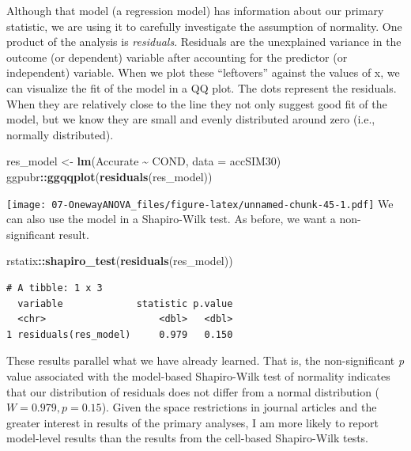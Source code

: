 \documentclass[
  11pt,
]{book}
\newenvironment{Shaded}{\begin{snugshade}}{\end{snugshade}}
\newcommand{\AttributeTok}[1]{\textcolor[rgb]{0.27,0.27,0.27}{#1}}
\newcommand{\FunctionTok}[1]{\textcolor[rgb]{0.27,0.27,0.27}{\textbf{#1}}}
\newcommand{\NormalTok}[1]{#1}
\newcommand{\OtherTok}[1]{\textcolor[rgb]{0.37,0.37,0.37}{#1}}
\newcommand{\SpecialCharTok}[1]{\textcolor[rgb]{0.43,0.43,0.43}{\textbf{#1}}}
\begin{document}
Although that model (a regression model) has information about our primary statistic, we are using it to carefully investigate the assumption of normality. One product of the analysis is \emph{residuals}. Residuals are the unexplained variance in the outcome (or dependent) variable after accounting for the predictor (or independent) variable. When we plot these ``leftovers'' against the values of x, we can visualize the fit of the model in a QQ plot. The dots represent the residuals. When they are relatively close to the line they not only suggest good fit of the model, but we know they are small and evenly distributed around zero (i.e., normally distributed).

\begin{Shaded}
\begin{Highlighting}[]
\NormalTok{res\_model }\OtherTok{\textless{}{-}} \FunctionTok{lm}\NormalTok{(Accurate }\SpecialCharTok{\textasciitilde{}}\NormalTok{ COND, }\AttributeTok{data =}\NormalTok{ accSIM30)}
\NormalTok{ggpubr}\SpecialCharTok{::}\FunctionTok{ggqqplot}\NormalTok{(}\FunctionTok{residuals}\NormalTok{(res\_model))}
\end{Highlighting}
\end{Shaded}

\texttt{[image: 07-OnewayANOVA\_files/figure-latex/unnamed-chunk-45-1.pdf]} We can also use the model in a Shapiro-Wilk test. As before, we want a non-significant result.

\begin{Shaded}
\begin{Highlighting}[]
\NormalTok{rstatix}\SpecialCharTok{::}\FunctionTok{shapiro\_test}\NormalTok{(}\FunctionTok{residuals}\NormalTok{(res\_model))}
\end{Highlighting}
\end{Shaded}

\begin{verbatim}
# A tibble: 1 x 3
  variable             statistic p.value
  <chr>                    <dbl>   <dbl>
1 residuals(res_model)     0.979   0.150
\end{verbatim}

These results parallel what we have already learned. That is, the non-significant \emph{p} value associated with the model-based Shapiro-Wilk test of normality indicates that our distribution of residuals does not differ from a normal distribution (\(W = 0.979, p = 0.15\)). Given the space restrictions in journal articles and the greater interest in results of the primary analyses, I am more likely to report model-level results than the results from the cell-based Shapiro-Wilk tests.
\end{document}
